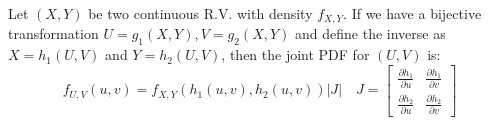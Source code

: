 \begin{ctheorem*}
  Let \((X, Y)\) be two continuous R.V. with density \(f_{X, Y}\). If we have a bijective transformation \(U = g_1(X, Y), V = g_2(X, Y)\) and define the inverse as \(X = h_1(U, V)\) and \(Y = h_2(U, V)\), then the joint PDF for \((U, V)\) is:
  \[f_{U, V}(u, v) = f_{X, Y}(h_1(u, v), h_2(u, v))|J| \quad J = \begin{bmatrix}
    \frac{\partial h_1}{\partial u} & \frac{\partial h_1}{\partial v} \\
    \frac{\partial h_2}{\partial u} & \frac{\partial h_2}{\partial v}
  \end{bmatrix}
  \]
\end{ctheorem*}
